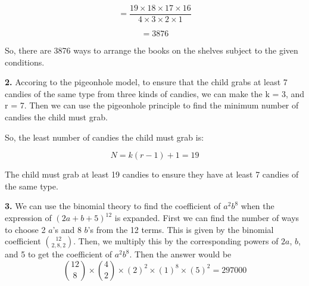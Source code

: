 \documentclass{article}
\begin{document}
\[= \frac{19 \times 18 \times 17 \times 16}{4 \times 3 \times 2 \times 1}\]

\[= 3876\]

So, there are 3876 ways to arrange the books on the shelves subject to the given conditions.

\textbf{2.}
Accoring to the pigeonhole model, to ensure that the child grabs at least 7 candies of the same type from three kinds of candies, we can make the k = 3, and r = 7. Then we can use the pigeonhole principle to find the minimum number of candies the child must grab. 

So, the least number of candies the child must grab is:

\[N = k(r - 1) + 1 = 19\]


The child must grab at least 19 candies to ensure they have at least 7 candies of the same type.

\textbf{3.}
We can use the binomial theory to find the coefficient of $a^2b^8$ when the expression of $(2a + b + 5)^{12}$ is expanded.
First we can find the number of ways to choose 2 \(a\)'s and 8 \(b\)'s from the 12 terms. This is given by the binomial coefficient \(\binom{12}{2, 8, 2}\).
Then, we multiply this by the corresponding powers of \(2a\), \(b\), and 5 to get the coefficient of \(a^2b^8\).
Then the answer would be \[ \binom{12}{8} \times \binom{4}{2} \times (2)^2 \times (1)^8 \times (5)^2 = 297000\]
\end{document}
